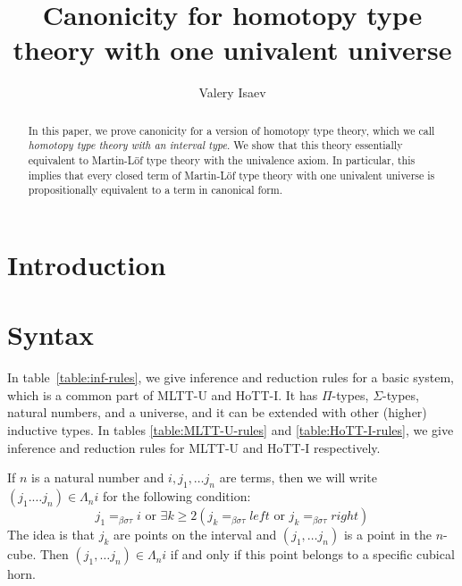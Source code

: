 \documentclass{amsart}
\theoremstyle{definition}
\theoremstyle{remark}
\newcommand{\bs}{\beta\sigma}
\newcommand{\bst}{\bs\tau}
\newcommand{\ebst}{=_{\bst}}
\numberwithin{figure}{section}
\begin{document}
\title{Canonicity for homotopy type theory with one univalent universe}

\author{Valery Isaev}

\begin{abstract}
In this paper, we prove canonicity for a version of homotopy type theory, which we call \emph{homotopy type theory with an interval type}.
We show that this theory essentially equivalent to Martin-L\"{o}f type theory with the univalence axiom.
In particular, this implies that every closed term of Martin-L\"{o}f type theory with one univalent universe is propositionally equivalent to a term in canonical form.
\end{abstract}

\maketitle

\section{Introduction}

\section{Syntax}

In table~\ref{table:inf-rules}, we give inference and reduction rules for a basic system, which is a common part of MLTT-U and HoTT-I.
It has $\Pi$-types, $\Sigma$-types, natural numbers, and a universe, and it can be extended with other (higher) inductive types.
In tables \ref{table:MLTT-U-rules} and \ref{table:HoTT-I-rules}, we give inference and reduction rules for MLTT-U and HoTT-I respectively.

If $n$ is a natural number and $i, j_1, \ldots j_n$ are terms, then we will write $(j_1. \ldots j_n) \in \Lambda_n i$ for the following condition:
\[ j_1 \ebst i \text{ or } \exists k \geq 2 (j_k \ebst left \text{ or } j_k \ebst right) \]
The idea is that $j_k$ are points on the interval and  $(j_1, \ldots j_n)$ is a point in the $n$-cube.
Then $(j_1, \ldots j_n) \in \Lambda_n i$ if and only if this point belongs to a specific cubical horn.
\end{document}
